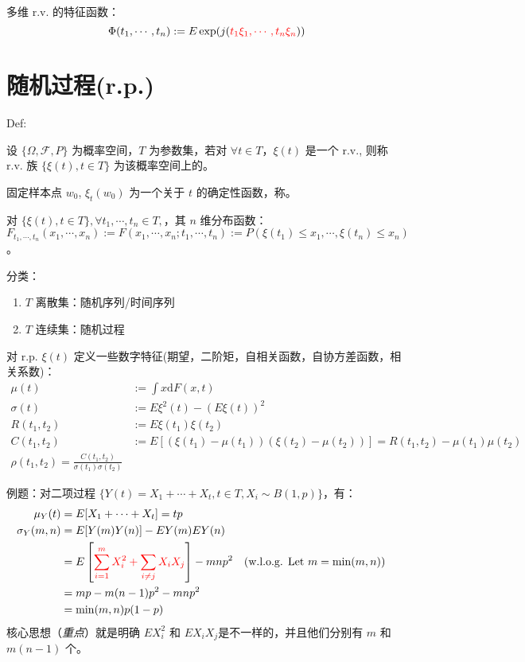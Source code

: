 多维 r.v. 的特征函数：
\begin{equation}
	\Phi(t_1, \cdots, t_n) := E \exp(j(\textcolor{red}{t_1 \xi_1, \cdots, t_n \xi_n}))
\end{equation}

\section{随机过程(r.p.)}

Def:

设 $\{\Omega, \mathcal{F}, P\}$ 为概率空间，$T$ 为参数集，若对 $\forall t \in T$，$\xi(t)$ 是一个 r.v., 则称 r.v. 族 $\{\xi(t), t\in T\}$ 为该概率空间上的。

固定样本点 $w_0$, $\xi_t(w_0)$ 为一个关于 $t$ 的确定性函数，称。


对 $\{\xi(t), t \in T\}, \forall t_1, \cdots, t_n \in T,$，其 $n$ 维分布函数：$F_{t_1,\cdots,t_n}(x_1, \cdots, x_n) := F(x_1, \cdots, x_n; t_1, \cdots, t_n) := P(\xi(t_1)\le x_1,\cdots, \xi(t_n)\le x_n)$。

分类：
\begin{enumerate}
	\item $T$ 离散集：随机序列/时间序列
	\item $T$ 连续集：随机过程
\end{enumerate}

对 r.p. $\xi(t)$ 定义一些数字特征(期望，二阶矩，自相关函数，自协方差函数，相关系数)：
\begin{align*}
	\mu(t) &:= \int x \mathrm{d}F(x,t) \\
	\sigma(t) &:= E\xi^2(t) - (E\xi(t))^2 \\
	R(t_1,t_2) &:= E\xi(t_1)\xi(t_2) \\
	C(t_1,t_2) &:= E[(\xi(t_1) - \mu(t_1))(\xi(t_2) - \mu(t_2))] = R(t_1, t_2) - \mu(t_1)\mu(t_2)\\
	\rho(t_1,t_2) = \frac{C(t_1,t_2)}{\sigma(t_1)\sigma(t_2)}
\end{align*}


例题：对二项过程 $\{Y(t) = X_1 + \cdots + X_t, t \in T, X_i \sim B(1, p)\}$，有：
\begin{align*}
	\mu_Y(t) &= E[X_1+\cdots + X_t] = tp \\
	\sigma_Y(m,n) &= E[Y(m)Y(n)] - EY(m)EY(n) \\
	&= E\left[\textcolor{red}{\sum_{i=1}^{m} X_i^2 + \sum_{i\ne j}X_i X_j}\right] - mnp^2 &&(\text{w.l.o.g. Let } m = \min(m,n))\\
	&= mp - m(n-1)p^2 - mnp^2 \\
	&= \min(m,n)p(1-p)
\end{align*}
核心思想（\emph{重点}）就是明确 $EX_i^2$ 和 $EX_iX_j$是不一样的，并且他们分别有 $m$ 和 $m(n-1)$ 个。

